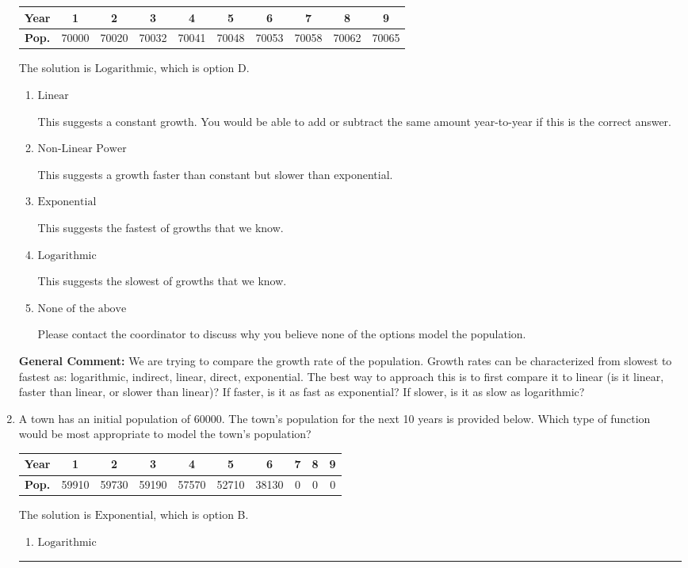 \documentclass{extbook}[14pt]
\newcommand{\litem}[1]{\item #1

\rule{\textwidth}{0.4pt}}
\begin{document}
\begin{enumerate}
{\begin{tabular}{c|c|c|c|c|c|c|c|c|c}
\textbf{Year} & 1 & 2 & 3 & 4 & 5 & 6 & 7 & 8 & 9 \tabularnewline
\hline
\textbf{Pop.} & 70000 & 70020 & 70032 & 70041 & 70048 & 70053 & 70058 & 70062 & 70065
\end{tabular} 

The solution is \( \text{Logarithmic} \), which is option D.\begin{enumerate}[label=\Alph*.]
\item \( \text{Linear} \)

This suggests a constant growth. You would be able to add or subtract the same amount year-to-year if this is the correct answer.
\item \( \text{Non-Linear Power} \)

This suggests a growth faster than constant but slower than exponential.
\item \( \text{Exponential} \)

This suggests the fastest of growths that we know.
\item \( \text{Logarithmic} \)

This suggests the slowest of growths that we know.
\item \( \text{None of the above} \)

Please contact the coordinator to discuss why you believe none of the options model the population.
\end{enumerate}

\textbf{General Comment:} We are trying to compare the growth rate of the population. Growth rates can be characterized from slowest to fastest as: logarithmic, indirect, linear, direct, exponential. The best way to approach this is to first compare it to linear (is it linear, faster than linear, or slower than linear)? If faster, is it as fast as exponential? If slower, is it as slow as logarithmic?
}
\litem{
A town has an initial population of 60000. The town's population for the next 10 years is provided below. Which type of function would be most appropriate to model the town's population?



\begin{tabular}{c|c|c|c|c|c|c|c|c|c}
\textbf{Year} & 1 & 2 & 3 & 4 & 5 & 6 & 7 & 8 & 9 \tabularnewline
\hline
\textbf{Pop.} & 59910 & 59730 & 59190 & 57570 & 52710 & 38130 & 0 & 0 & 0
\end{tabular} 

The solution is \( \text{Exponential} \), which is option B.\begin{enumerate}[label=\Alph*.]
\item \( \text{Logarithmic} \)


\end{enumerate}}
\end{enumerate}
\end{document}

